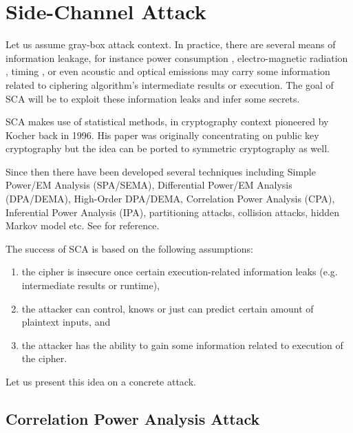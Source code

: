 \section{Side-Channel Attack}
\label{sec:side}

Let us assume gray-box attack context. In practice, there are several means of information leakage, for instance power consumption \cite{kocher1999differential}, electro-magnetic radiation \cite{agrawal2002side,gandolfi2001electromagnetic,quisquater2001electromagnetic}, timing \cite{kocher1996timing}, or even acoustic \cite{asonov2004keyboard} and optical \cite{kuhn2002optical,loughry2002information} emissions may carry some information related to ciphering algorithm's intermediate results or execution. The goal of SCA will be to exploit these information leaks and infer some secrets.

SCA makes use of statistical methods, in cryptography context pioneered by Kocher \cite{kocher1996timing} back in 1996. His paper was originally concentrating on public key cryptography but the idea can be ported to symmetric cryptography as well.

Since then there have been developed several techniques including Simple Power/EM Analysis (SPA/SEMA), Differential Power/EM Analysis (DPA/DEMA), High-Order DPA/DEMA, Correlation Power Analysis (CPA), Inferential Power Analysis (IPA), partitioning attacks, collision attacks, hidden Markov model etc. See \cite[Chapters~13-14]{koc2008cryptographic} for reference.

The success of SCA is based on the following assumptions:
\begin{enumerate}
	\item the cipher is insecure once certain execution-related information leaks (e.g. intermediate results or runtime),
	\item the attacker can control, knows or just can predict certain amount of plaintext inputs, and
	\item the attacker has the ability to gain some information related to execution of the cipher.
\end{enumerate}
Let us present this idea on a concrete attack.



\subsection{Correlation Power Analysis Attack}

